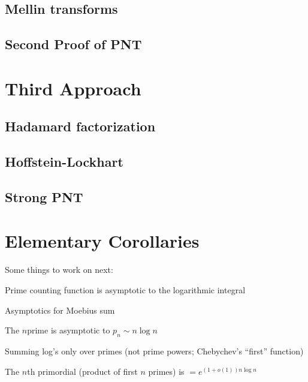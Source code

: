\documentclass{report}
\theoremstyle{definition}
\begin{document}
\section{Mellin transforms}


\section{Second Proof of PNT}



\chapter{Third Approach}

\section{Hadamard factorization}


\section{Hoffstein-Lockhart}


\section{Strong PNT}


\chapter{Elementary Corollaries}

Some things to work on next:

Prime counting function is asymptotic to the logarithmic integral

Asymptotics for Moebius sum

The $n$prime is asymptotic to $p_n \sim n \log n$

Summing log's only over primes (not prime powers; Chebychev's ``first'' function)

The $n$th primordial (product of first $n$ primes) is $=e^{(1+o(1))n\log n}$
\end{document}
